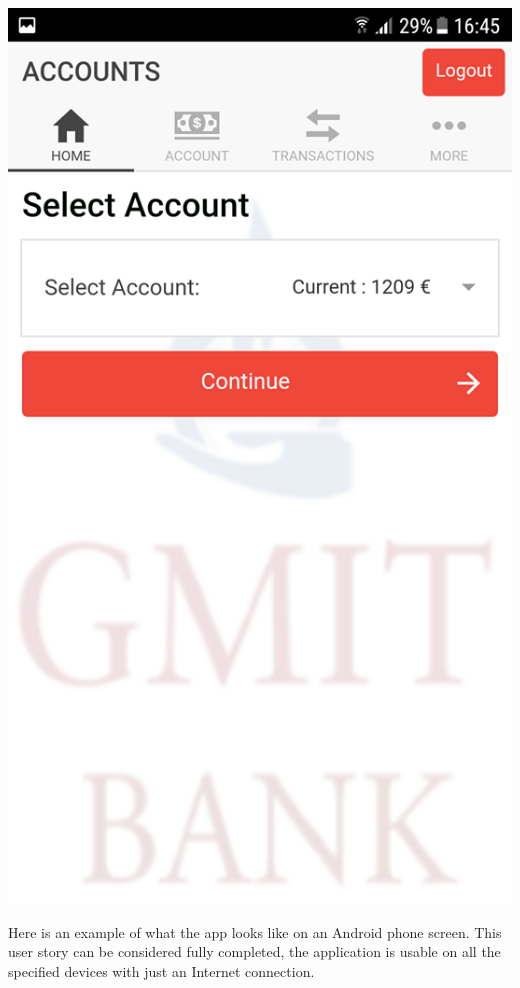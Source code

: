 \begin{itemize}
\begin{enumerate}
\begin{itemize}
            \end{itemize}
\begin{center}    
    \includegraphics[scale=0.5]{img/7homepageaccount.png}
\end{center}
            Here is an example of what the app looks like on an Android phone screen.
            This user story can be considered fully completed, the application is usable on all the specified devices with just an Internet connection.
        \end{enumerate}

\end{itemize}
